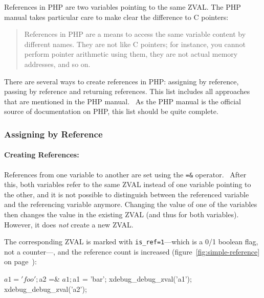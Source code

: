 References in PHP are two variables pointing to the same ZVAL. The PHP manual takes particular care to make clear the difference to C pointers:~\cite{php-manual-what-references-are}\cite{php-manual-what-references-are-not}

\begin{quote}
References in PHP are a means to access the same variable content by different names. They are not like C pointers; for instance, you cannot perform pointer arithmetic using them, they are not actual memory addresses, and so on.
\end{quote}

There are several ways to create references in PHP: assigning by reference, passing by reference and returning references. This list includes all approaches that are mentioned in the PHP manual.~\cite{php-manual-references} As the PHP manual is the official source of documentation on PHP, this list should be quite complete.


\subsubsection{Assigning by Reference}

\paragraph{Creating References:}

References from one variable to another are set using the \texttt{=\&} operator.~\cite[page 129]{wenz-php53}\cite{php-manual-what-references-do} After this, both variables refer to the same ZVAL instead of one variable pointing to the other, and it is not possible to distinguish between the referenced variable and the referencing variable anymore. Changing the value of one of the variables then changes the value in the existing ZVAL (and thus for both variables). However, it does \emph{not} create a new ZVAL.

The corresponding ZVAL is marked with \texttt{is\_ref=1}---which is a 0/1 boolean flag, not a counter---, and the reference count is increased (figure~\ref{fig:simple-reference} on page~\pageref{fig:simple-reference}):

\begin{phpcode}
$a1 = 'foo';
$a2 =& $a1;
$a1 = 'bar';
xdebug_debug_zval('a1');
xdebug_debug_zval('a2');
\end{phpcode}

